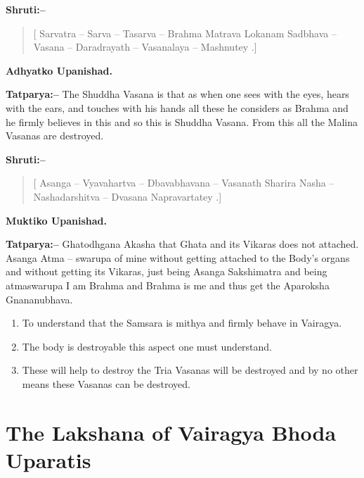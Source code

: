 \textbf{Shruti:–}

\begin{verse}
[ Sarvatra – Sarva – Tasarva – Brahma Matrava Lokanam Sadbhava – Vasana – Daradrayath – Vasanalaya – Mashnutey .]
\end{verse}

\begin{flushright}
\textbf{Adhyatko Upanishad.}
\end{flushright}

\textbf{Tatparya:–} The Shuddha Vasana is that as when one sees with the eyes, hears with the ears, and touches with his hands all these he considers as Brahma and he firmly believes in this and so this is Shuddha Vasana. From this all the Malina Vasanas are destroyed.

\textbf{Shruti:–}

\begin{verse}
[ Asanga – Vyavahartva – Dbavabhavana – Vasanath  Sharira Nasha – Nashadarshitva – Dvasana Napravartatey .]
\end{verse}

\begin{flushright}
\textbf{Muktiko Upanishad.}
\end{flushright}

\textbf{Tatparya:–} Ghatodhgana Akasha that Ghata and its Vikaras does not attached. Asanga Atma – swarupa of mine without getting attached to the Body's organs and without getting its Vikaras, just being Asanga Sakshimatra and being atmaswarupa I am Brahma and Brahma is me and thus get the Aparoksha Gnananubhava.

\begin{enumerate}
\item To understand that the Samsara is mithya and firmly behave in Vairagya.

 \item The body is destroyable this aspect one must understand.

 \item These will help to destroy the Tria Vasanas will be destroyed and by no other means these Vasanas can be destroyed.

\end{enumerate}

\chapter{The Lakshana of Vairagya Bhoda Uparatis}

